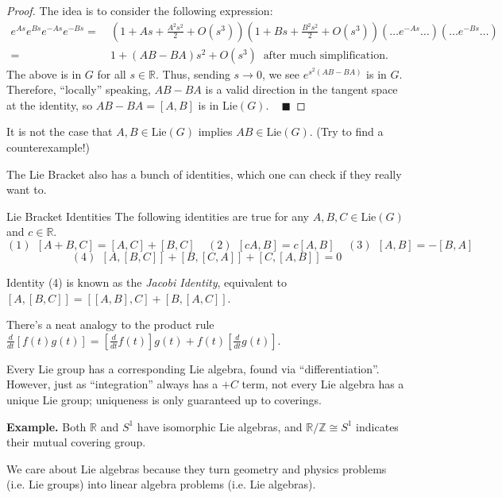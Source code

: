 \begin{proof}
    The idea is to consider the following expression:
    \begin{align*}
        e^{As} e^{Bs} e^{-As} e^{-Bs} = \ & \left(1 + As + \frac{A^2s^2}{2} + O(s^3) \right) \left(1 + Bs + \frac{B^2s^2}{2} + O(s^3) \right)\left(\dots \text{$e^{-As}$}\dots \right)\left(\dots \text{$e^{-Bs}$}\dots \right) \\
        = \ & 1 + (AB - BA)s^2 + O(s^3) ~ \text{ after much simplification.}    \end{align*}
    The above is in $G$ for all $s \in \mathbb{R}$.  Thus, sending $s \to 0$, we see $e^{s^2(AB - BA)}$ is in $G$.  Therefore, ``locally'' speaking, $AB - BA$ is a valid direction in the tangent space at the identity, so $AB - BA = [A, B]$ is in $\mathrm{Lie}(G)$. ~ $\blacksquare$
\end{proof}


\begin{remark}
    It is not the case that $A, B \in \mathrm{Lie}(G)$ implies $AB \in \mathrm{Lie}(G)$.  (Try to find a counterexample!)
\end{remark}

The Lie Bracket also has a bunch of identities, which one can check if they really want to.

\begin{theorem}{Lie Bracket Identities}
    The following identities are true for any $A, B, C \in \mathrm{Lie}(G)$ and $c \in \mathbb{R}$.
    \[ (1) ~~ [A + B, C] = [A, C] + [B, C]  ~~~~~ (2) ~~ [cA, B] = c[A, B] ~~~~~ (3) ~~ [A, B] = -[B, A] \] \vspace{-0.8cm}
    \[ (4) ~~ [A, [B, C]] + [B, [C, A]] + [C, [A, B]] = 0 \] \vspace{-0.6cm}
\end{theorem}

\begin{remark}
    Identity (4) is known as the \emph{Jacobi Identity}, equivalent to $[A, [B, C]] = [[A, B], C] + [B, [A, C]]$.
    
    There's a neat analogy to the product rule $\frac{d}{dt} \left [ f(t) g(t) \right ]  = \left [ \frac{d}{dt}f(t) \right ] g(t) + f(t) \left [ \frac{d}{dt} g(t) \right ]$.
\end{remark}

Every Lie group has a corresponding Lie algebra, found via ``differentiation''.  However, just as ``integration'' always has a $+C$ term, not every Lie algebra has a unique Lie group; uniqueness is only guaranteed up to coverings.

\textbf{Example.} Both $\mathbb{R}$ and $S^1$ have isomorphic Lie algebras, and $\mathbb{R} / \mathbb{Z} \cong S^1$ indicates their mutual covering group.

We care about Lie algebras because they turn geometry and physics problems (i.e. Lie groups) into linear algebra problems (i.e. Lie algebras).

